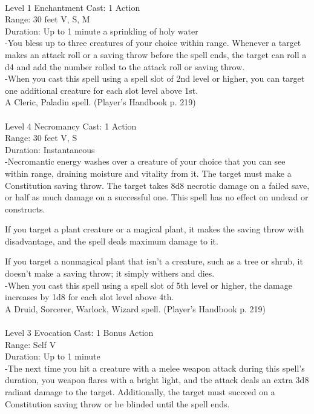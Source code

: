 \documentclass[10pt,twocolumn]{report}
\begin{document}
 \\
Level 1 \quad Enchantment \quad Cast: 1 Action\\
Range: 30 feet \quad V, S, M\\
Duration: Up to 1 minute \quad a sprinkling of holy water\\
-You bless up to three creatures of your choice within range. Whenever a target makes an attack roll or a saving throw before the spell ends, the target can roll a d4 and add the number rolled to the attack roll or saving throw.\\
-When you cast this spell using a spell slot of 2nd level or higher, you can target one additional creature for each slot level above 1st.\\
A Cleric, Paladin spell. (Player's Handbook p. 219) \\


 \\
Level 4 \quad Necromancy \quad Cast: 1 Action\\
Range: 30 feet \quad V, S\\
Duration: Instantaneous \quad \\
-Necromantic energy washes over a creature of your choice that you can see within range, draining moisture and vitality from it. The target must make a Constitution saving throw. The target takes 8d8 necrotic damage on a failed save, or half as much damage on a successful one. This spell has no effect on undead or constructs. 

If you target a plant creature or a magical plant, it makes the saving throw with disadvantage, and the spell deals maximum damage to it. 

If you target a nonmagical plant that isn’t a creature, such as a tree or shrub, it doesn’t make a saving throw; it simply withers and dies.\\
-When you cast this spell using a spell slot of 5th level or higher, the damage increases by 1d8 for each slot level above 4th.\\
A Druid, Sorcerer, Warlock, Wizard spell. (Player's Handbook p. 219) \\


 \\
Level 3 \quad Evocation \quad Cast: 1 Bonus Action\\
Range: Self \quad V\\
Duration: Up to 1 minute \quad \\
-The next time you hit a creature with a melee weapon attack during this spell’s duration, you weapon flares with a bright light, and the attack deals an extra 3d8 radiant damage to the target. Additionally, the target must succeed on a Constitution saving throw or be blinded until the spell ends. 
\end{document}
